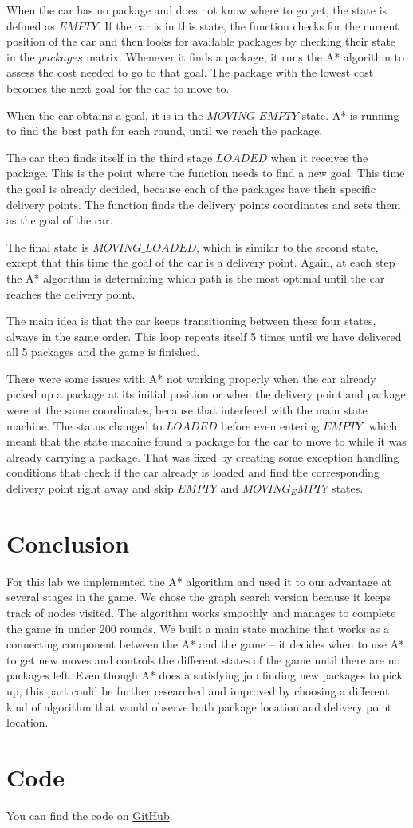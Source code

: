 \documentclass[a4paper]{article}
\begin{document}
When the car has no package and does not know where to go yet, the state is defined as $EMPTY$. If the car is in this state, the function checks for the current position of the car and then looks for available packages by checking their state in the $packages$ matrix. Whenever it finds a package, it runs the A* algorithm to assess the cost needed to go to that goal. The package with the lowest cost becomes the next goal for the car to move to.

When the car obtains a goal, it is in the $MOVING\_EMPTY$ state. A* is running to find the best path for each round, until we reach the package.

The car then finds itself in the third stage $LOADED$ when it receives the package. This is the point where the function needs to find a new goal. This time the goal is already decided, because each of the packages have their specific delivery points. The function finds the delivery points coordinates and sets them as the goal of the car.

The final state is $MOVING\_LOADED$, which is similar to the second state, except that this time the goal of the car is a delivery point. Again, at each step the A* algorithm is determining which path is the most optimal until the car reaches the delivery point.

The main idea is that the car keeps transitioning between these four states, always in the same order. This loop repeats itself 5 times until we have delivered all 5 packages and the game is finished.

There were some issues with A* not working properly when the car already picked up a package at its initial position or when the delivery point and package were at the same coordinates, because that interfered with the main state machine. The status changed to $LOADED$ before even entering $EMPTY$, which meant that the state machine found a package for the car to move to while it was already carrying a package. That was fixed by creating some exception handling conditions that check if the car already is loaded and find the corresponding delivery point right away and skip $EMPTY$ and $MOVING_EMPTY$ states.

\section{Conclusion}
For this lab we implemented the A* algorithm and used it to our advantage at several stages in the game. We chose the graph search version because it keeps track of nodes visited. The algorithm works smoothly and manages to complete the game in under 200 rounds. We built a main state machine that works as a connecting component between the A* and the game -- it decides when to use A* to get new moves and controls the different states of the game until there are no packages left. Even though A* does a satisfying job finding new packages to pick up, this part could be further researched and improved by choosing a different kind of algorithm that would observe both package location and delivery point location.

\section{Code}
You can find the code on \href{https://github.com/m3x1m0m/Artificial-Intelligence-Course/}{GitHub}.



\end{document}
